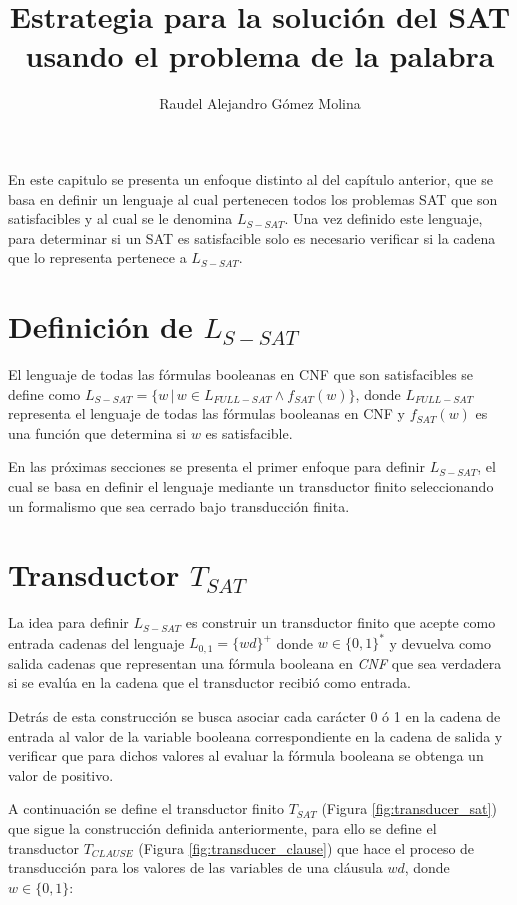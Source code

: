 \documentclass[12pt]{article}
\title{Estrategia para la solución del SAT usando el problema de la palabra}
\author{Raudel Alejandro Gómez Molina}
\begin{document}
\maketitle

En este capitulo se presenta un enfoque distinto al del capítulo anterior, que se basa en definir un lenguaje al cual
pertenecen todos los problemas SAT que son satisfacibles y al cual se le denomina $L_{S-SAT}$. Una vez definido este lenguaje, para determinar
si un SAT es satisfacible solo es necesario verificar si la cadena que lo representa pertenece a $L_{S-SAT}$.

\section{Definición de $L_{S-SAT}$}

El lenguaje de todas las fórmulas booleanas en CNF que son satisfacibles se define como $L_{S-SAT}=\{w\,|\,w \in L_{FULL-SAT} \wedge f_{SAT}(w)\}$, 
donde $L_{FULL-SAT}$ representa el lenguaje de todas las fórmulas booleanas en CNF y $f_{SAT}(w)$ es una función que 
determina si $w$ es satisfacible.

En las próximas secciones se presenta el primer enfoque para definir $L_{S-SAT}$, el cual se basa en definir
el lenguaje mediante un transductor finito seleccionando un formalismo que sea cerrado bajo transducción finita.
\section{Transductor $T_{SAT}$}

La idea para definir $L_{S-SAT}$ es construir un transductor finito que acepte como entrada cadenas del lenguaje $L_{0,1}=\{wd\}^+$ donde $w\in \{0,1\}^*$
y devuelva como salida cadenas que representan una fórmula booleana en \textit{CNF} que sea verdadera si se evalúa en la cadena que el transductor recibió como entrada.

Detrás de esta construcción se busca asociar cada carácter 0 ó 1 en la cadena de entrada al valor de la variable booleana correspondiente 
en la cadena de salida y verificar que para dichos valores al evaluar la fórmula booleana se obtenga un valor de 
positivo.

A continuación se define el transductor finito $T_{SAT}$ (Figura \ref{fig:transducer_sat}) que sigue la construcción definida anteriormente, 
para ello se define el transductor $T_{CLAUSE}$ (Figura \ref{fig:transducer_clause}) que hace el proceso de transducción 
para los valores de las variables de una cláusula $wd$, donde $w\in \{0,1\}$:
\end{document}
